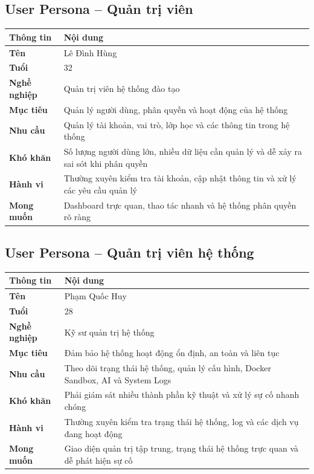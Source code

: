 \documentclass[12pt,a4paper,oneside]{report}
\begin{document}
\subsection{User Persona -- Quản trị viên}


\begin{center}
\vspace{4pt}
\begin{tabular}{|>{\bfseries}p{3.2cm}|p{11.5cm}|}
\hline
Thông tin & Nội dung \\
\hline
Tên & Lê Đình Hùng \\
\hline
Tuổi & 32 \\
\hline
Nghề nghiệp & Quản trị viên hệ thống đào tạo \\
\hline
Mục tiêu & Quản lý người dùng, phân quyền và hoạt động của hệ thống \\
\hline
Nhu cầu & Quản lý tài khoản, vai trò, lớp học và các thông tin trong hệ thống \\
\hline
Khó khăn & Số lượng người dùng lớn, nhiều dữ liệu cần quản lý và dễ xảy ra sai sót khi phân quyền \\
\hline
Hành vi & Thường xuyên kiểm tra tài khoản, cập nhật thông tin và xử lý các yêu cầu quản lý \\
\hline
Mong muốn & Dashboard trực quan, thao tác nhanh và hệ thống phân quyền rõ ràng \\
\hline
\end{tabular}
\end{center}

\newpage

\subsection{User Persona -- Quản trị viên hệ thống}


\begin{center}
\vspace{4pt}
\begin{tabular}{|>{\bfseries}p{3.2cm}|p{11.5cm}|}
\hline
Thông tin & Nội dung \\
\hline
Tên & Phạm Quốc Huy \\
\hline
Tuổi & 28 \\
\hline
Nghề nghiệp & Kỹ sư quản trị hệ thống \\
\hline
Mục tiêu & Đảm bảo hệ thống hoạt động ổn định, an toàn và liên tục \\
\hline
Nhu cầu & Theo dõi trạng thái hệ thống, quản lý cấu hình, Docker Sandbox, AI và System Logs \\
\hline
Khó khăn & Phải giám sát nhiều thành phần kỹ thuật và xử lý sự cố nhanh chóng \\
\hline
Hành vi & Thường xuyên kiểm tra trạng thái hệ thống, log và các dịch vụ đang hoạt động \\
\hline
Mong muốn & Giao diện quản trị tập trung, trạng thái hệ thống trực quan và dễ phát hiện sự cố \\
\hline
\end{tabular}
\end{center}
\end{document}
